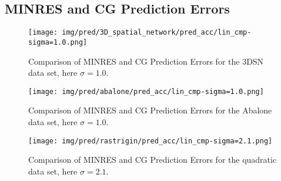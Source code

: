 \subsection{MINRES and CG Prediction Errors}
\hfill


\begin{figure}[ht]
    \centering
    \texttt{[image: img/pred/3D\_spatial\_network/pred\_acc/lin\_cmp-sigma=1.0.png]}
    \caption{Comparison of MINRES and CG Prediction Errors for the 3DSN data set, here $\sigma=1.0$.}
    \label{fig: minres-cg-3dsn-ferr}
\end{figure}


\begin{figure}[ht]
    \centering
    \texttt{[image: img/pred/abalone/pred\_acc/lin\_cmp-sigma=1.0.png]}
    \caption{Comparison of MINRES and CG Prediction Errors for the Abalone data set, here $\sigma=1.0$.}
    \label{fig: minres-cg-aba-ferr}
\end{figure}


\begin{figure}[ht]
    \centering
    \texttt{[image: img/pred/rastrigin/pred\_acc/lin\_cmp-sigma=2.1.png]}
    \caption{Comparison of MINRES and CG Prediction Errors for the quadratic data set, here $\sigma=2.1$.}
    \label{fig: minres-cg-quad-ferr}
\end{figure}




